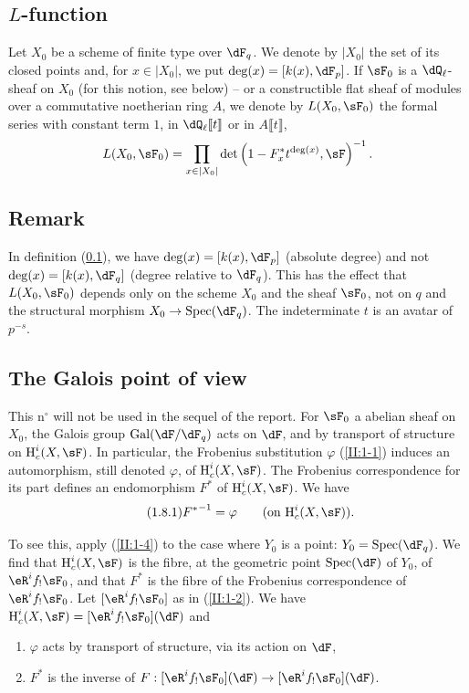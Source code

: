 \subsection{\texorpdfstring{$L$}{L}-function}\label{II:1-6}

Let $X_0$ be a scheme of finite type over $\dF_q$. We denote by $|X_0|$ the set of
its closed points and, for $x\in |X_0|$, we put $\deg(x)=[k(x),\dF_p]$. If
$\sF_0$ is a $\dQ_\ell$-sheaf on $X_0$ (for this notion, see
below) -- or a constructible flat sheaf of modules over a
commutative noetherian ring $A$, we denote by $L(X_0,\sF_0)$ the formal series
with constant term $1$, in $\dQ_\ell\llbracket t\rrbracket$ or in
$A\llbracket t\rrbracket$,
\[
  L(X_0,\sF_0) = \prod_{x\in|X_0|} \det\left(1-F_x^* t^{\deg(x)},\sF\right)^{-1} \text{.}
\]




\subsection{Remark}\label{II:1-7}

In definition (\ref{II:1-6}), we have $\deg(x)=[k(x),\dF_p]$ (absolute
degree) and not $\deg(x)=[k(x),\dF_q]$ (degree relative to $\dF_q$). This has
the effect that $L(X_0,\sF_0)$ depends only on the scheme $X_0$ and the sheaf
$\sF_0$, not on $q$ and the structural morphism $X_0\to\spec(\dF_q)$.
The indeterminate $t$ is an avatar of $p^{-s}$.




\subsection{The Galois point of view}\label{II:1-8}

This n$^\circ$ will not be used in the sequel of the report. For $\sF_0$ a
abelian sheaf on $X_0$, the Galois group $\gal(\dF/\dF_q)$ acts on
$\dF$, and by transport of structure on $\h_c^i(X,\sF)$. In particular, the
Frobenius substitution $\varphi$ (\ref{II:1-1}) induces an automorphism,
still denoted $\varphi$, of $\h_c^i(X,\sF)$. The Frobenius correspondence
for its part defines an endomorphism $F^*$ of $\h_c^i(X,\sF)$. We have
\begin{equation*}\tag{1.8.1}\label{II:eq:1-8-1}
  {F^*}^{-1} = \varphi \qquad \text{(on $\h_c^i(X,\sF)$).}
\end{equation*}

To see this, apply (\ref{II:1-4}) to the case where $Y_0$ is a point:
$Y_0=\spec(\dF_q)$. We find that $\h_c^i(X,\sF)$ is the fibre, at the
geometric point $\spec(\dF)$ of $Y_0$, of $\eR^i f_! \sF_0$, and that $F^*$ is
the fibre of the Frobenius correspondence of $\eR^i f_!\sF_0$. Let
$[\eR^i f_! \sF_0]$ as in (\ref{II:1-2}). We have
$\h_c^i(X,\sF) = [\eR^i f_!\sF_0](\dF)$ and
\begin{enumerate}[\indent a)]
  \item $\varphi$ acts by transport of structure, via its action on $\dF$,
  \item $F^*$ is the inverse of
    $F:[\eR^i f_!\sF_0](\dF) \to [\eR^i f_!\sF_0](\dF)$.
\end{enumerate}

